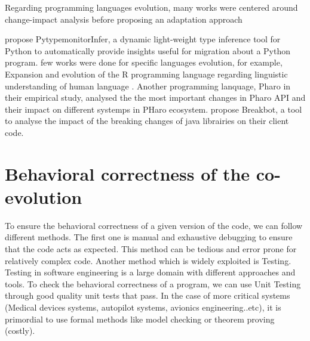 Regarding programming languages evolution, many works were centered around change-impact analysis before proposing an adaptation approach \cite{arnold1996software,ren2004chianti,ryder2001change}


 
 \cite{urma2017programming} propose PytypemonitorInfer, a dynamic light-weight type inference tool for Python to automatically provide insights useful for migration about a Python program.
 few works were done for specific languages evolution, for example, Expansion and evolution of the R programming language regarding linguistic understanding of human language \cite{urma2017programming}.
Another programming lanquage, Pharo \cite{7332471} in their empirical study, analysed the the most important changes in Pharo API and their impact on different systemps in PHaro ecosystem.
\cite{10.1145/3510455.3512783} propose Breakbot, a tool to analyse the impact of  the breaking changes of java librairies on their client code.
	
 \section{Behavioral correctness of the co-evolution}
 
 
 
 
 
 

 To ensure the behavioral correctness of a given version of the code, we can follow different methods. The first one is manual and exhaustive debugging to ensure that the code acts as expected. This method can be tedious and error prone for relatively complex code. Another method which is widely exploited is Testing. Testing in software engineering is a large domain with different approaches and tools. To check the behavioral correctness of a program, we can use Unit Testing through good quality unit tests that pass. In the case of more critical systems (Medical devices systems, autopilot systems, avionics engineering..etc), it is primordial to use formal methods like model checking or theorem proving \cite{ZHANG201312} (costly).
 

